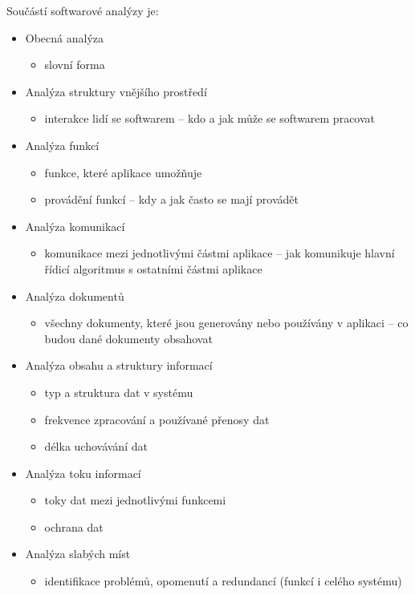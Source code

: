 \begin{enumerate}[label=\arabic*)]
    Součástí softwarové analýzy je:
    \begin{itemize}
        \item Obecná analýza
        \begin{itemize}[\tiny {}]
            \item slovní forma
        \end{itemize}
        \item Analýza struktury vnějšího prostředí
        \begin{itemize}[\tiny {}]
            \item interakce lidí se softwarem – kdo a jak může se softwarem pracovat
        \end{itemize}
        \item Analýza funkcí
        \begin{itemize}[\tiny {}]
            \item funkce, které aplikace umožňuje
            \item provádění funkcí – kdy a jak často se mají provádět
        \end{itemize}
        \item Analýza komunikací
        \begin{itemize}[\tiny {}]
            \item komunikace mezi jednotlivými částmi aplikace – jak komunikuje hlavní řídicí algoritmus
            s ostatními částmi aplikace
        \end{itemize}
        \item Analýza dokumentů
        \begin{itemize}[\tiny {}]
            \item všechny dokumenty, které jsou generovány nebo používány v aplikaci – co budou dané
            dokumenty obsahovat
        \end{itemize}
        \item Analýza obsahu a struktury informací
        \begin{itemize}[\tiny {}]
            \item typ a struktura dat v systému
            \item frekvence zpracování a používané přenosy dat
            \item délka uchovávání dat
        \end{itemize}
        \item Analýza toku informací
        \begin{itemize}[\tiny {}]
            \item toky dat mezi jednotlivými funkcemi
            \item ochrana dat
        \end{itemize}
        \item Analýza slabých míst
        \begin{itemize}[\tiny {}]
            \item identifikace problémů, opomenutí a redundancí (funkcí i celého systému)
        \end{itemize}
    \end{itemize}


\end{enumerate}
